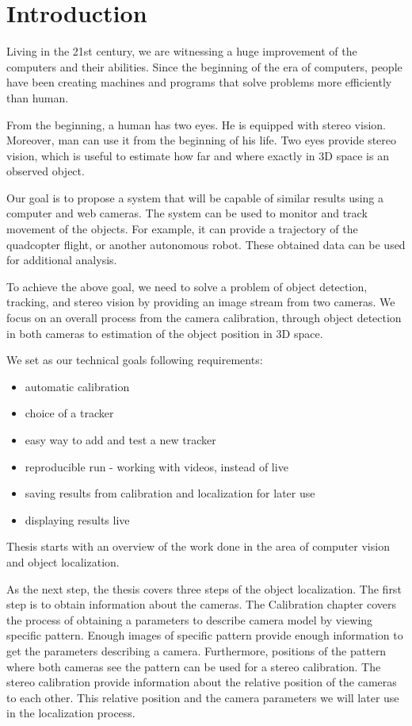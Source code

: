 \chapter*{Introduction}

Living in the 21st century, we are witnessing a huge improvement of the
computers and their abilities. Since the beginning of the era of computers,
people have been creating machines and programs that solve problems more
efficiently than human.

From the beginning, a human has two eyes. He is equipped with stereo vision.
Moreover, man can use it from the beginning of his life. Two eyes provide
stereo vision, which is useful to estimate how far and where exactly in 3D
space is an observed object.

Our goal is to propose a system that will be capable of similar results using a
computer and web cameras. The system can be used to monitor and track movement
of the objects. For example, it can provide a trajectory of the quadcopter
flight, or another autonomous robot. These obtained data can be used for
additional analysis.

To achieve the above goal, we need to solve a problem of object detection,
tracking, and stereo vision by providing an image stream from two cameras. We
focus on an overall process from the camera calibration, through object
detection in both cameras to estimation of the object position in 3D space.

We set as our technical goals following requirements:
\begin{itemize}
\item automatic calibration
\item choice of a tracker
\item easy way to add and test a new tracker
\item reproducible run - working with videos, instead of live
\item saving results from calibration and localization for later use
\item displaying results live
\end{itemize}

Thesis starts with an overview of the work done in the area of computer vision
and object localization.

As the next step, the thesis covers three steps of the object localization. The
first step is to obtain information about the cameras. The Calibration chapter
covers the process of obtaining a parameters to describe camera model by
viewing specific pattern. Enough images of specific pattern provide enough
information to get the parameters describing a camera.  Furthermore, positions
of the pattern where both cameras see the pattern can be used for a stereo
calibration. The stereo calibration provide information about the relative
position of the cameras to each other. This relative position and the camera
parameters we will later use in the localization process.

